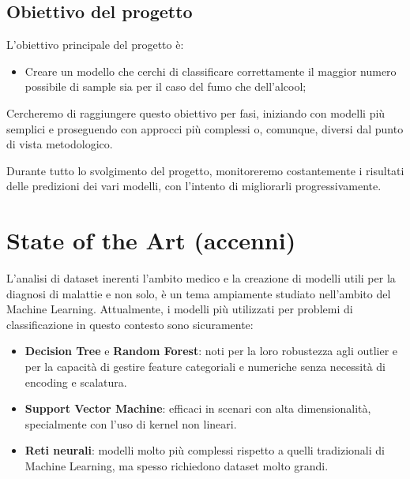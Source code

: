 \documentclass{article}
\begin{document}
\begin{multicols}{2}
\begin{enumerate}[leftmargin=*]
    
\end{enumerate}

\subsection{Obiettivo del progetto}

L'obiettivo principale del progetto è:

\begin{itemize}[leftmargin=*]
    \item Creare un modello che cerchi di classificare correttamente il maggior numero possibile di sample sia per il caso del fumo che dell'alcool;
\end{itemize}

Cercheremo di raggiungere questo obiettivo per fasi, iniziando con modelli più semplici e proseguendo con approcci più complessi o, comunque, diversi dal punto di vista metodologico.

Durante tutto lo svolgimento del progetto, monitoreremo costantemente i risultati delle predizioni dei vari modelli, con l'intento di migliorarli progressivamente.

\section{State of the Art (accenni)}

L'analisi di dataset inerenti l'ambito medico e la creazione di modelli utili per la diagnosi di malattie e non solo, è un tema ampiamente studiato nell'ambito del Machine Learning. Attualmente, i modelli più utilizzati per problemi di classificazione in questo contesto sono sicuramente:

\begin{itemize}[leftmargin=*]
    \item \textbf{Decision Tree} e \textbf{Random Forest}: noti per la loro robustezza agli outlier e per la capacità di gestire feature categoriali e numeriche senza necessità di encoding e scalatura.
    \item \textbf{Support Vector Machine}: efficaci in scenari con alta dimensionalità, specialmente con l'uso di kernel non lineari.
    \item \textbf{Reti neurali}: modelli molto più complessi rispetto a quelli tradizionali di Machine Learning, ma spesso richiedono dataset molto grandi.
\end{itemize}


\end{multicols}
\end{document}
